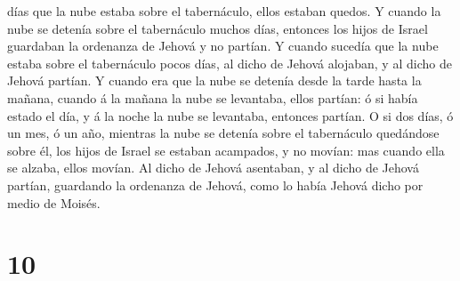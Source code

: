 días que la nube estaba sobre el tabernáculo, ellos estaban quedos.
 Y cuando la nube se detenía sobre el tabernáculo muchos
días, entonces los hijos de Israel guardaban la ordenanza de Jehová y no
partían.  Y cuando sucedía que la nube estaba sobre el
tabernáculo pocos días, al dicho de Jehová alojaban, y al dicho de
Jehová partían.  Y cuando era que la nube se detenía desde
la tarde hasta la mañana, cuando á la mañana la nube se levantaba, ellos
partían: ó si había estado el día, y á la noche la nube se levantaba,
entonces partían.  O si dos días, ó un mes, ó un año,
mientras la nube se detenía sobre el tabernáculo quedándose sobre él,
los hijos de Israel se estaban acampados, y no movían: mas cuando ella
se alzaba, ellos movían.  Al dicho de Jehová asentaban, y
al dicho de Jehová partían, guardando la ordenanza de Jehová, como lo
había Jehová dicho por medio de Moisés.

\hypertarget{section-9}{%
\section{10}\label{section-9}}

